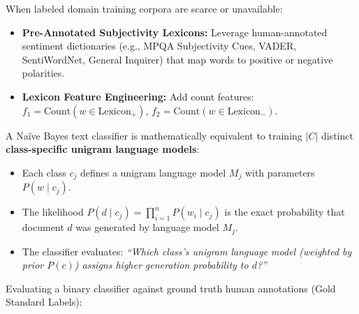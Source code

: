 \documentclass[10pt,a4paper]{article}
\begin{document}
\vspace{-2pt}

\par\vspace{1pt}
When labeled domain training corpora are scarce or unavailable:
\begin{itemize}[leftmargin=12pt, itemsep=0.5pt, parsep=0pt, topsep=0.5pt]
    \item \textbf{Pre-Annotated Subjectivity Lexicons:} Leverage human-annotated sentiment dictionaries (e.g., MPQA Subjectivity Cues, VADER, SentiWordNet, General Inquirer) that map words to positive or negative polarities.
    \item \textbf{Lexicon Feature Engineering:} Add count features: $f_1 = \text{Count}(w \in \text{Lexicon}_+)$, $f_2 = \text{Count}(w \in \text{Lexicon}_-)$.
\end{itemize}

\vspace{-2pt}

\par\vspace{1pt}
A Naïve Bayes text classifier is mathematically equivalent to training $|C|$ distinct \textbf{class-specific unigram language models}:
\begin{itemize}[leftmargin=12pt, itemsep=0.5pt, parsep=0pt, topsep=0.5pt]
    \item Each class $c_j$ defines a unigram language model $M_j$ with parameters $P(w \mid c_j)$.
    \item The likelihood $P(d \mid c_j) = \prod_{i=1}^n P(w_i \mid c_j)$ is the exact probability that document $d$ was generated by language model $M_j$.
    \item The classifier evaluates: \textit{``Which class's unigram language model (weighted by prior $P(c)$) assigns higher generation probability to $d$?''}
\end{itemize}

\newpage


\par\vspace{1pt}
Evaluating a binary classifier against ground truth human annotations (Gold Standard Labels):
\end{document}
